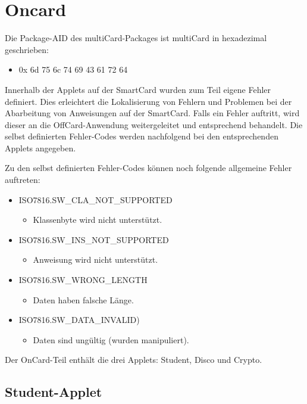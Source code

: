 \section{Oncard}
\label{label:oncard}

Die Package-AID des multiCard-Packages ist multiCard in hexadezimal geschrieben:
\begin{itemize}
	\item 0x 6d 75 6c 74 69 43 61 72 64
\end{itemize}

Innerhalb der Applets auf der SmartCard wurden zum Teil eigene Fehler definiert.
Dies erleichtert die Lokalisierung von Fehlern und Problemen bei der Abarbeitung von Anweisungen auf der SmartCard.
Falls ein Fehler auftritt, wird dieser an die OffCard-Anwendung weitergeleitet und entsprechend behandelt.
Die selbst definierten Fehler-Codes werden nachfolgend bei den entsprechenden Applets angegeben.

Zu den selbst definierten Fehler-Codes können noch folgende allgemeine Fehler auftreten:
\begin{itemize}
	\item ISO7816.SW\_CLA\_NOT\_SUPPORTED
	\begin{itemize}
		\item Klassenbyte wird nicht unterstützt.
	\end{itemize}
	\item ISO7816.SW\_INS\_NOT\_SUPPORTED
	\begin{itemize}
		\item Anweisung wird nicht unterstützt.
	\end{itemize}
	\item ISO7816.SW\_WRONG\_LENGTH
	\begin{itemize}
		\item Daten haben falsche Länge.
	\end{itemize}
	\item ISO7816.SW\_DATA\_INVALID)
	\begin{itemize}
		\item Daten sind ungültig (wurden manipuliert).
	\end{itemize}
\end{itemize}

Der OnCard-Teil enthält die drei Applets: Student, Disco und Crypto.

\subsection{Student-Applet}

